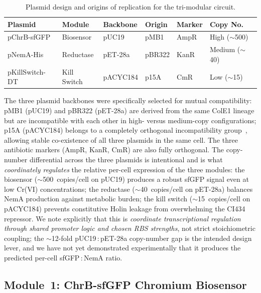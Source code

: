 \documentclass[10pt,twocolumn,letterpaper,
              colorlinks=true,
              linkcolor=blue!70!black,
              citecolor=blue!70!black,
              urlcolor=blue!70!black,
              pdfborder={0 0 0}]{article}
\begin{document}
\begin{table}[!t]
\centering
\caption{Plasmid design and origins of replication for the
  tri-modular circuit.}
\label{tab:plasmids}
\small
\begin{tabular}{@{}llllll@{}}
\toprule
\textbf{Plasmid} & \textbf{Module} & \textbf{Backbone} &
\textbf{Origin} & \textbf{Marker} & \textbf{Copy No.} \\
\midrule
pChrB-sfGFP     & Biosensor   & pUC19     & pMB1   & AmpR & High ($\sim$500) \\
pNemA-His       & Reductase   & pET-28a   & pBR322 & KanR & Medium ($\sim$40) \\
pKillSwitch-DT  & Kill Switch & pACYC184  & p15A   & CmR  & Low ($\sim$15) \\
\bottomrule
\end{tabular}
\end{table}

The three plasmid backbones were specifically selected for mutual
compatibility: pMB1 (pUC19) and pBR322 (pET-28a) are derived from the
same ColE1 lineage but are incompatible with each other in high- versus
medium-copy configurations; p15A (pACYC184) belongs to a completely
orthogonal incompatibility group~\cite{velappan2021}, allowing stable
co-existence of all three plasmids in the same cell. The three antibiotic
markers (AmpR, KanR, CmR) are also fully orthogonal. The copy-number
differential across the three plasmids is intentional and is what
\textit{coordinately regulates} the relative per-cell expression of the
three modules: the biosensor ($\sim$500~copies/cell on pUC19) produces a
robust sfGFP signal even at low Cr(VI) concentrations; the reductase
($\sim$40~copies/cell on pET-28a) balances NemA production against
metabolic burden; the kill switch ($\sim$15~copies/cell on pACYC184)
prevents constitutive Holin leakage from overwhelming the CI434
repressor. We note explicitly that this is \textit{coordinate
transcriptional regulation through shared promoter logic and chosen RBS
strengths}, not strict stoichiometric coupling; the $\sim$12-fold
pUC19\,:\,pET-28a copy-number gap is the intended design lever, and we
have not yet demonstrated experimentally that it produces the predicted
per-cell sfGFP\,:\,NemA ratio.

\subsection{Module~1: ChrB-sfGFP Chromium Biosensor}
\end{document}
